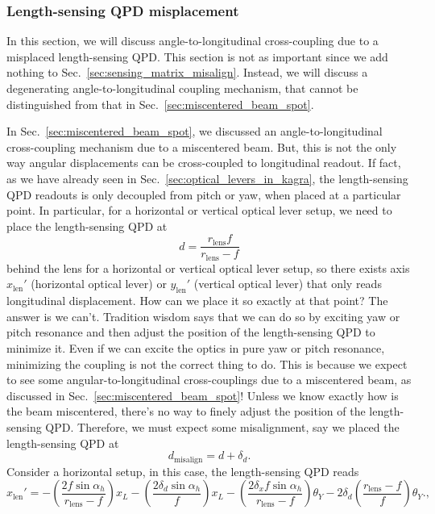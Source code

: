 \subsubsection{Length-sensing QPD misplacement}
In this section, we will discuss angle-to-longitudinal cross-coupling due to a misplaced length-sensing QPD.
This section is not as important since we add nothing to Sec.~\ref{sec:sensing_matrix_misalign}.
Instead, we will discuss a degenerating angle-to-longitudinal coupling mechanism, that cannot be distinguished from that in Sec.~\ref{sec:miscentered_beam_spot}.

In Sec.~\ref{sec:miscentered_beam_spot}, we discussed an angle-to-longitudinal cross-coupling mechanism due to a miscentered beam.
But, this is not the only way angular displacements can be cross-coupled to longitudinal readout.
If fact, as we have already seen in Sec.~\ref{sec:optical_levers_in_kagra}, the length-sensing QPD readouts is only decoupled from pitch or yaw, when placed at a particular point.
In particular, for a horizontal or vertical optical lever setup, we need to place the length-sensing QPD at
\begin{equation}
	d=\frac{r_\mathrm{lens}f}{r_\mathrm{lens}-f}
\end{equation}
behind the lens for a horizontal or vertical optical lever setup, so there exists axis $x_\mathrm{len}'$ (horizontal optical lever) or $y_\mathrm{len}'$ (vertical optical lever) that only reads longitudinal displacement.
How can we place it so exactly at that point?
The answer is we can't.
Tradition wisdom says that we can do so by exciting yaw or pitch resonance and then adjust the position of the length-sensing QPD to minimize it.
Even if we can excite the optics in pure yaw or pitch resonance, minimizing the coupling is not the correct thing to do.
This is because we expect to see some angular-to-longitudinal cross-couplings due to a miscentered beam, as discussed in Sec.~\ref{sec:miscentered_beam_spot}!
Unless we know exactly how is the beam miscentered, there's no way to finely adjust the position of the length-sensing QPD.
Therefore, we must expect some misalignment, say we placed the length-sensing QPD at
\begin{equation}
	d_\mathrm{misalign} = d + \delta_d.
\end{equation}
Consider a horizontal setup,
in this case, the length-sensing QPD reads
\begin{equation}
	x_\mathrm{len}' = -\left(\frac{2f\sin\alpha_h}{r_\mathrm{lens}-f}\right)x_L - \left(\frac{2\delta_d\sin\alpha_h}{f}\right)x_L - \left(\frac{2\delta_xf\sin\alpha_h}{r_\mathrm{lens}-f}\right)\theta_Y - 2\delta_d\left(\frac{r_\mathrm{lens}-f}{f}\right)\theta_Y.
	\label{eqn:x_len_misplaced_qpd},
\end{equation}
